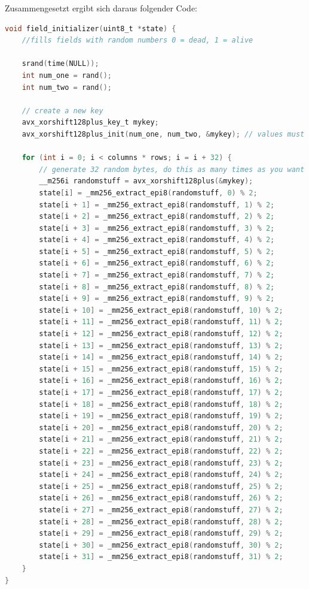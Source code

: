 \documentclass[german,plainarticle,hyperref,utf8]{zihpub}
\begin{document}
	Zusammengesetzt ergibt sich daraus folgender Code:\\
	
	\begin{lstlisting}[language=C, caption=Daten Initialisierung]
void field_initializer(uint8_t *state) {
	//fills fields with random numbers 0 = dead, 1 = alive
	
	srand(time(NULL));
	int num_one = rand();
	int num_two = rand();
	
	// create a new key
	avx_xorshift128plus_key_t mykey;
	avx_xorshift128plus_init(num_one, num_two, &mykey); // values must be non-zero
	
	for (int i = 0; i < columns * rows; i = i + 32) {
		// generate 32 random bytes, do this as many times as you want
		__m256i randomstuff = avx_xorshift128plus(&mykey);
		state[i] = _mm256_extract_epi8(randomstuff, 0) % 2;
		state[i + 1] = _mm256_extract_epi8(randomstuff, 1) % 2;
		state[i + 2] = _mm256_extract_epi8(randomstuff, 2) % 2;
		state[i + 3] = _mm256_extract_epi8(randomstuff, 3) % 2;
		state[i + 4] = _mm256_extract_epi8(randomstuff, 4) % 2;
		state[i + 5] = _mm256_extract_epi8(randomstuff, 5) % 2;
		state[i + 6] = _mm256_extract_epi8(randomstuff, 6) % 2;
		state[i + 7] = _mm256_extract_epi8(randomstuff, 7) % 2;
		state[i + 8] = _mm256_extract_epi8(randomstuff, 8) % 2;
		state[i + 9] = _mm256_extract_epi8(randomstuff, 9) % 2;
		state[i + 10] = _mm256_extract_epi8(randomstuff, 10) % 2;
		state[i + 11] = _mm256_extract_epi8(randomstuff, 11) % 2;
		state[i + 12] = _mm256_extract_epi8(randomstuff, 12) % 2;
		state[i + 13] = _mm256_extract_epi8(randomstuff, 13) % 2;
		state[i + 14] = _mm256_extract_epi8(randomstuff, 14) % 2;
		state[i + 15] = _mm256_extract_epi8(randomstuff, 15) % 2;
		state[i + 16] = _mm256_extract_epi8(randomstuff, 16) % 2;
		state[i + 17] = _mm256_extract_epi8(randomstuff, 17) % 2;
		state[i + 18] = _mm256_extract_epi8(randomstuff, 18) % 2;
		state[i + 19] = _mm256_extract_epi8(randomstuff, 19) % 2;
		state[i + 20] = _mm256_extract_epi8(randomstuff, 20) % 2;
		state[i + 21] = _mm256_extract_epi8(randomstuff, 21) % 2;
		state[i + 22] = _mm256_extract_epi8(randomstuff, 22) % 2;
		state[i + 23] = _mm256_extract_epi8(randomstuff, 23) % 2;
		state[i + 24] = _mm256_extract_epi8(randomstuff, 24) % 2;
		state[i + 25] = _mm256_extract_epi8(randomstuff, 25) % 2;
		state[i + 26] = _mm256_extract_epi8(randomstuff, 26) % 2;
		state[i + 27] = _mm256_extract_epi8(randomstuff, 27) % 2;
		state[i + 28] = _mm256_extract_epi8(randomstuff, 28) % 2;
		state[i + 29] = _mm256_extract_epi8(randomstuff, 29) % 2;
		state[i + 30] = _mm256_extract_epi8(randomstuff, 30) % 2;
		state[i + 31] = _mm256_extract_epi8(randomstuff, 31) % 2;
	}
}\end{lstlisting}
\end{document}
